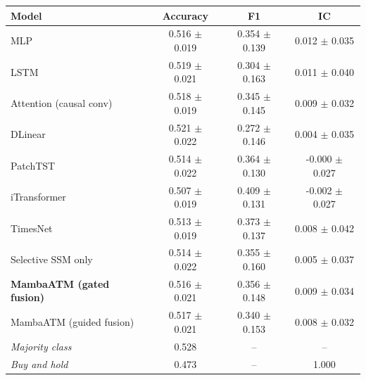{\footnotesize
\setlength{\tabcolsep}{2pt}
\begin{tabular}{lccc}
\toprule
\textbf{Model} & \textbf{Accuracy} & \textbf{F1} & \textbf{IC} \\
\midrule
MLP & 0.516 $\pm$ 0.019 & 0.354 $\pm$ 0.139 & 0.012 $\pm$ 0.035 \\
LSTM & 0.519 $\pm$ 0.021 & 0.304 $\pm$ 0.163 & 0.011 $\pm$ 0.040 \\
Attention (causal conv) & 0.518 $\pm$ 0.019 & 0.345 $\pm$ 0.145 & 0.009 $\pm$ 0.032 \\
DLinear & 0.521 $\pm$ 0.022 & 0.272 $\pm$ 0.146 & 0.004 $\pm$ 0.035 \\
PatchTST & 0.514 $\pm$ 0.022 & 0.364 $\pm$ 0.130 & -0.000 $\pm$ 0.027 \\
iTransformer & 0.507 $\pm$ 0.019 & 0.409 $\pm$ 0.131 & -0.002 $\pm$ 0.027 \\
TimesNet & 0.513 $\pm$ 0.019 & 0.373 $\pm$ 0.137 & 0.008 $\pm$ 0.042 \\
Selective SSM only & 0.514 $\pm$ 0.022 & 0.355 $\pm$ 0.160 & 0.005 $\pm$ 0.037 \\
\textbf{MambaATM (gated fusion)} & 0.516 $\pm$ 0.021 & 0.356 $\pm$ 0.148 & 0.009 $\pm$ 0.034 \\
MambaATM (guided fusion) & 0.517 $\pm$ 0.021 & 0.340 $\pm$ 0.153 & 0.008 $\pm$ 0.032 \\
\midrule
\emph{Majority class} & 0.528 & -- & -- \\
\emph{Buy and hold} & 0.473 & -- & 1.000 \\
\bottomrule
\end{tabular}
}

